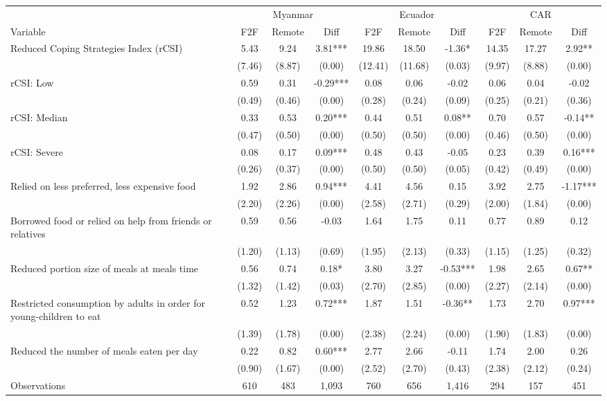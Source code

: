 \begin{tabular}{l*{9}c}
\hline\hline
 & \multicolumn{3}{c}{Myanmar} & \multicolumn{3}{c}{Ecuador} & \multicolumn{3}{c}{CAR}\\ 
Variable & F2F & Remote & Diff & F2F & Remote & Diff & F2F & Remote & Diff \\
\hline
Reduced Coping Strategies Index (rCSI)&5.43&9.24&3.81***&19.86&18.50&-1.36*&14.35&17.27&2.92**\\
&(7.46)&(8.87)&(0.00)&(12.41)&(11.68)&(0.03)&(9.97)&(8.88)&(0.00)\\
rCSI: Low&0.59&0.31&-0.29***&0.08&0.06&-0.02&0.06&0.04&-0.02\\
&(0.49)&(0.46)&(0.00)&(0.28)&(0.24)&(0.09)&(0.25)&(0.21)&(0.36)\\
rCSI: Median&0.33&0.53&0.20***&0.44&0.51&0.08**&0.70&0.57&-0.14**\\
&(0.47)&(0.50)&(0.00)&(0.50)&(0.50)&(0.00)&(0.46)&(0.50)&(0.00)\\
rCSI: Severe&0.08&0.17&0.09***&0.48&0.43&-0.05&0.23&0.39&0.16***\\
&(0.26)&(0.37)&(0.00)&(0.50)&(0.50)&(0.05)&(0.42)&(0.49)&(0.00)\\
Relied on less preferred, less expensive food&1.92&2.86&0.94***&4.41&4.56&0.15&3.92&2.75&-1.17***\\
&(2.20)&(2.26)&(0.00)&(2.58)&(2.71)&(0.29)&(2.00)&(1.84)&(0.00)\\
Borrowed food or relied on help from friends or relatives&0.59&0.56&-0.03&1.64&1.75&0.11&0.77&0.89&0.12\\
&(1.20)&(1.13)&(0.69)&(1.95)&(2.13)&(0.33)&(1.15)&(1.25)&(0.32)\\
Reduced portion size of meals at meals time&0.56&0.74&0.18*&3.80&3.27&-0.53***&1.98&2.65&0.67**\\
&(1.32)&(1.42)&(0.03)&(2.70)&(2.85)&(0.00)&(2.27)&(2.14)&(0.00)\\
Restricted consumption by adults in order for young-children to eat&0.52&1.23&0.72***&1.87&1.51&-0.36**&1.73&2.70&0.97***\\
&(1.39)&(1.78)&(0.00)&(2.38)&(2.24)&(0.00)&(1.90)&(1.83)&(0.00)\\
Reduced the number of meals eaten per day&0.22&0.82&0.60***&2.77&2.66&-0.11&1.74&2.00&0.26\\
&(0.90)&(1.67)&(0.00)&(2.52)&(2.70)&(0.43)&(2.38)&(2.12)&(0.24)\\
\hline
Observations & 610 & 483 & 1,093 & 760 & 656 & 1,416 & 294 & 157 & 451 \\
\hline\hline
\end{tabular}
